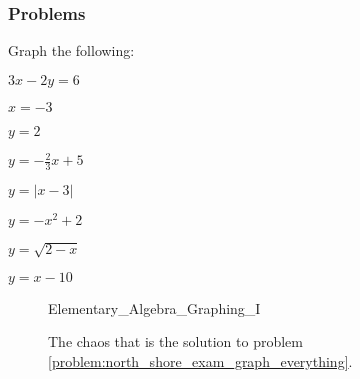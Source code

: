 \documentclass[crop=false,class=book,oneside]{standalone}                      %
\begin{document}
        \subsubsection{Problems}
        \begin{problem}
        \label{problem:north_shore_exam_graph_everything}Graph the following:
        \begin{enumerate}
        \begin{multicols}{4}
            \item $3x-2y=6$
            \item $x=-3$
            \item $y=2$
            \item $y=-\frac{2}{3}x+5$
            \item $y=|x-3|$
            \item $y=-x^2+2$
            \item $y=\sqrt{2-x}$
            \item $y=x-10$
        \end{multicols}
        \end{enumerate}
        \end{problem}
        \begin{figure}[H]
            \centering
            \captionsetup{type=figure}
            {Elementary_Algebra_Graphing_I}
            \caption{The chaos that is the solution to problem
                     \ref{problem:north_shore_exam_graph_everything}.}
            \label{fig:north_shore_graphing_problem}
        \end{figure}
\end{document}
